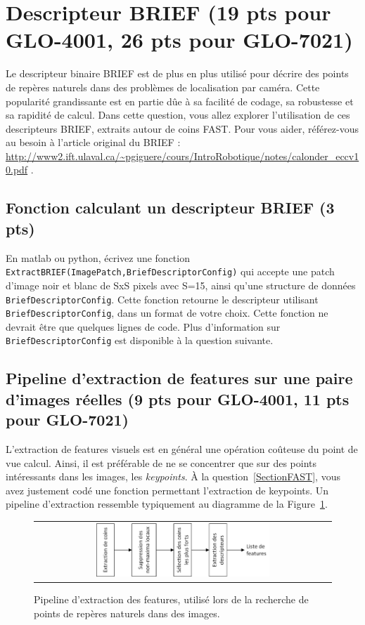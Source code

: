 \documentclass[12pt]{article}
\begin{document}

\newpage
\section{Descripteur BRIEF (19 pts pour GLO-4001, 26 pts pour GLO-7021)}
Le descripteur binaire BRIEF est de plus en plus utilisé pour décrire des points de repères naturels dans des problèmes de localisation par caméra. Cette popularité grandissante est en partie dûe à sa facilité de codage, sa robustesse et sa rapidité de calcul. Dans cette question, vous allez explorer l'utilisation de ces descripteurs BRIEF, extraits autour de coins FAST. Pour vous aider, référez-vous au besoin à l'article original du BRIEF : \url{http://www2.ift.ulaval.ca/~pgiguere/cours/IntroRobotique/notes/calonder_eccv10.pdf} .

\subsection{Fonction calculant un descripteur BRIEF (3 pts)}
En matlab ou python, écrivez une fonction \texttt{ExtractBRIEF(ImagePatch,BriefDescriptorConfig)} qui accepte une patch d'image noir et blanc de SxS pixels avec S=15, ainsi qu'une structure de données \texttt{BriefDescriptorConfig}. Cette fonction retourne le descripteur utilisant \texttt{BriefDescriptorConfig}, dans un format de votre choix. Cette fonction ne devrait être que quelques lignes de code. Plus d'information sur \texttt{BriefDescriptorConfig} est disponible à la question suivante.

\subsection{Pipeline d'extraction de features sur une paire d'images réelles (9 pts pour GLO-4001, 11 pts pour GLO-7021)}
L'extraction de features visuels est en général une opération coûteuse du point de vue calcul. Ainsi, il est préférable de ne se concentrer que sur des points intéressants dans les images, les \emph{keypoints}. À la question~\ref{SectionFAST}, vous avez justement codé une fonction permettant l'extraction de keypoints. Un pipeline d'extraction ressemble typiquement au diagramme de la Figure~\ref{PipelineExtraction}.

\begin{figure}[ht]
 \begin{center}
  \begin{tabular}{c}
    \includegraphics[width=0.6\textwidth]{PipelineExtraction.png} 
  \end{tabular}
 \end{center}
\vspace{-0.25in}
 \caption{Pipeline d'extraction des features, utilisé lors de la recherche de points de repères naturels dans des images.}
 \label{PipelineExtraction}
\end{figure}
\end{document}
